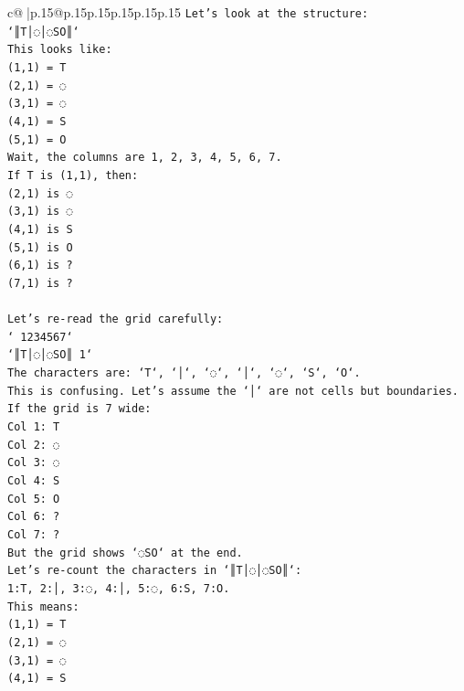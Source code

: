 \documentclass{article}
\begin{document}
{\begin{supertabular}{c@{$\;$}|p{.15\linewidth}@{}p{.15\linewidth}p{.15\linewidth}p{.15\linewidth}p{.15\linewidth}p{.15\linewidth}}
{{{\texttt{Let's look at the structure:} \\
\texttt{`║T│◌│◌SO║`} \\
\texttt{This looks like:} \\
\texttt{(1,1) = T} \\
\texttt{(2,1) = ◌} \\
\texttt{(3,1) = ◌} \\
\texttt{(4,1) = S} \\
\texttt{(5,1) = O} \\
\texttt{Wait, the columns are 1, 2, 3, 4, 5, 6, 7.} \\
\texttt{If T is (1,1), then:} \\
\texttt{(2,1) is ◌} \\
\texttt{(3,1) is ◌} \\
\texttt{(4,1) is S} \\
\texttt{(5,1) is O} \\
\texttt{(6,1) is ?} \\
\texttt{(7,1) is ?} \\
\\ 
\texttt{Let's re{-}read the grid carefully:} \\
\texttt{` 1234567`} \\
\texttt{`║T│◌│◌SO║ 1`} \\
\texttt{The characters are: `T`, `│`, `◌`, `│`, `◌`, `S`, `O`.} \\
\texttt{This is confusing. Let's assume the `│` are not cells but boundaries.} \\
\texttt{If the grid is 7 wide:} \\
\texttt{Col 1: T} \\
\texttt{Col 2: ◌} \\
\texttt{Col 3: ◌} \\
\texttt{Col 4: S} \\
\texttt{Col 5: O} \\
\texttt{Col 6: ?} \\
\texttt{Col 7: ?} \\
\texttt{But the grid shows `◌SO` at the end.} \\
\texttt{Let's re{-}count the characters in `║T│◌│◌SO║`:} \\
\texttt{1:T, 2:│, 3:◌, 4:│, 5:◌, 6:S, 7:O.} \\
\texttt{This means:} \\
\texttt{(1,1) = T} \\
\texttt{(2,1) = ◌} \\
\texttt{(3,1) = ◌} \\
\texttt{(4,1) = S} \\
}}}
\end{supertabular}}
\end{document}
